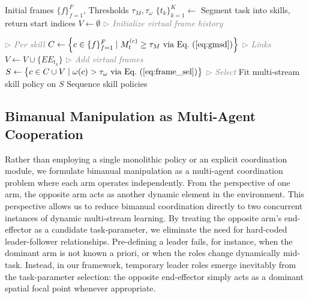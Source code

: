 \documentclass[letterpaper, 10 pt, journal, twoside]{IEEEtran}
\renewcommand{\eqref}[1]{Eq.~(\ref{#1})}
\newcommand{\ourmethod}{DynaMAC\xspace}
\begin{document}
%
\begin{algorithm}[t]
\caption{\ourmethod: Dynamic Multi-Stream Learning}
\label{alg:dynamic_multistream}
\begin{algorithmic}[1]
\Require Initial frames $\{f\}_{f=1}^F$, Thresholds $\tau_M, \tau_{\omega}$
\State $\{t_k\}_{k=1}^K \leftarrow$ Segment task into skills, return start indices
\State $V \leftarrow \emptyset$ \hfill \textcolor{gray}{\(\triangleright\) \textit{Initialize virtual frame history}}

 \hfill \textcolor{gray}{\(\triangleright\) \textit{Per skill}}
    \State $C \leftarrow \left\{ c \in \{f\}_{f=1}^F \mid M_t^{(c)} \ge \tau_M \text{ via \eqref{eq:gmsd}} \right\}$ \hfill \textcolor{gray}{\(\triangleright\) \textit{Links}}
    \State $V \leftarrow V \cup \{\mathit{EE}_{t_k}\}$ \hfill \textcolor{gray}{\(\triangleright\) \textit{Add virtual frames}}
    \State $S \leftarrow \left\{ c \in C \cup V \mid \omega(c) > \tau_{\omega} \text{ via \eqref{eq:frame_sel}} \right\}$ \hfill \textcolor{gray}{\(\triangleright\) \textit{Select}}
    \State Fit multi-stream skill policy on $S$
\EndFor
\State Sequence skill policies
\end{algorithmic}
\end{algorithm} 
\subsection{Bimanual Manipulation as Multi-Agent Cooperation}\label{sec:appr_biman}
Rather than employing a single monolithic policy or an explicit coordination module, we formulate bimanual manipulation as a multi-agent coordination problem where each arm operates independently.
From the perspective of one arm, the opposite arm acts as another dynamic element in the environment.
This perspective allows us to reduce bimanual coordination directly to two concurrent instances of dynamic multi-stream learning.
%
%
%
By treating the opposite arm's end-effector as a candidate task-parameter, we eliminate the need for hard-coded leader-follower relationships.
Pre-defining a leader fails, for instance, when the dominant arm is not known a priori, or when the roles change dynamically mid-task.
%
%
Instead, in our framework, temporary leader roles emerge inevitably from the task-parameter selection: the opposite end-effector simply acts as a dominant spatial focal point whenever appropriate.
%
%
%
\end{document}
